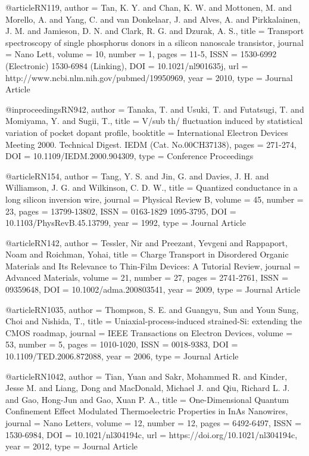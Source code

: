 @article{RN119,
   author = {Tan, K. Y. and Chan, K. W. and Mottonen, M. and Morello, A. and Yang, C. and van Donkelaar, J. and Alves, A. and Pirkkalainen, J. M. and Jamieson, D. N. and Clark, R. G. and Dzurak, A. S.},
   title = {Transport spectroscopy of single phosphorus donors in a silicon nanoscale transistor},
   journal = {Nano Lett},
   volume = {10},
   number = {1},
   pages = {11-5},
   ISSN = {1530-6992 (Electronic)
1530-6984 (Linking)},
   DOI = {10.1021/nl901635j},
   url = {http://www.ncbi.nlm.nih.gov/pubmed/19950969},
   year = {2010},
   type = {Journal Article}
}

@inproceedings{RN942,
   author = {Tanaka, T. and Usuki, T. and Futatsugi, T. and Momiyama, Y. and Sugii, T.},
   title = {V/sub th/ fluctuation induced by statistical variation of pocket dopant profile},
   booktitle = {International Electron Devices Meeting 2000. Technical Digest. IEDM (Cat. No.00CH37138)},
   pages = {271-274},
   DOI = {10.1109/IEDM.2000.904309},
   type = {Conference Proceedings}
}

@article{RN154,
   author = {Tang, Y. S. and Jin, G. and Davies, J. H. and Williamson, J. G. and Wilkinson, C. D. W.},
   title = {Quantized conductance in a long silicon inversion wire},
   journal = {Physical Review B},
   volume = {45},
   number = {23},
   pages = {13799-13802},
   ISSN = {0163-1829
1095-3795},
   DOI = {10.1103/PhysRevB.45.13799},
   year = {1992},
   type = {Journal Article}
}

@article{RN142,
   author = {Tessler, Nir and Preezant, Yevgeni and Rappaport, Noam and Roichman, Yohai},
   title = {Charge Transport in Disordered Organic Materials and Its Relevance to Thin-Film Devices: A Tutorial Review},
   journal = {Advanced Materials},
   volume = {21},
   number = {27},
   pages = {2741-2761},
   ISSN = {09359648},
   DOI = {10.1002/adma.200803541},
   year = {2009},
   type = {Journal Article}
}

@article{RN1035,
   author = {Thompson, S. E. and Guangyu, Sun and Youn Sung, Choi and Nishida, T.},
   title = {Uniaxial-process-induced strained-Si: extending the CMOS roadmap},
   journal = {IEEE Transactions on Electron Devices},
   volume = {53},
   number = {5},
   pages = {1010-1020},
   ISSN = {0018-9383},
   DOI = {10.1109/TED.2006.872088},
   year = {2006},
   type = {Journal Article}
}

@article{RN1042,
   author = {Tian, Yuan and Sakr, Mohammed R. and Kinder, Jesse M. and Liang, Dong and MacDonald, Michael J. and Qiu, Richard L. J. and Gao, Hong-Jun and Gao, Xuan P. A.},
   title = {One-Dimensional Quantum Confinement Effect Modulated Thermoelectric Properties in InAs Nanowires},
   journal = {Nano Letters},
   volume = {12},
   number = {12},
   pages = {6492-6497},
   ISSN = {1530-6984},
   DOI = {10.1021/nl304194c},
   url = {https://doi.org/10.1021/nl304194c},
   year = {2012},
   type = {Journal Article}
}

